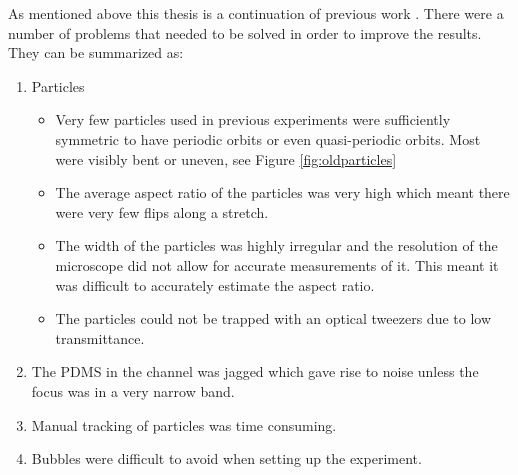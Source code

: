 As mentioned above this thesis is a continuation of previous work \cite{AntonThesis, JonasExperiment, Mishra}. There were a number of problems that needed to be solved in order to improve the results. They can be summarized as:
\begin{enumerate} \label{list:problems}
	\item Particles 
	\begin{itemize}
		\item Very few particles used in previous experiments were sufficiently symmetric to have periodic orbits or even quasi-periodic orbits. Most were visibly bent or uneven, see Figure \ref{fig:oldparticles}
		\item The average aspect ratio of the particles was very high which meant there were very few flips along a stretch.
		\item The width of the particles was highly irregular and the resolution of the microscope did not allow for accurate measurements of it. This meant it was difficult to accurately estimate the aspect ratio.
		\item The particles could not be trapped with an optical tweezers due to low transmittance.
	\end{itemize}
	\item The PDMS in the channel was jagged which gave rise to noise unless the focus was in a very narrow band.
	\item Manual tracking of particles was time consuming.
	\item Bubbles were difficult to avoid when setting up the experiment.
\end{enumerate}